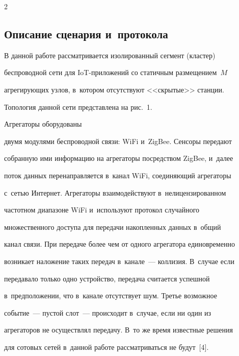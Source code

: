 \begin{multicols}{2}
\subsection{Описание сценария и~протокола}





\vspace*{-1pt}


    


    В данной работе рассматривается изолированный сегмент (кластер) 


беспроводной сети для IoT-при\-ло\-же\-ний со статичным размещением~$M$ 


агрегирующих узлов, в~котором отсутствуют <<скрытые>> станции. 


Топология данной сети представлена на рис.~1. 





Агрегаторы оборудованы 


двумя модулями беспроводной связи: WiFi и~ZigBee. Сенсоры передают 


собранную ими информацию на агрегаторы посредством ZigBee, и~далее 


поток данных перенаправляется в~канал WiFi, соединяющий агрегаторы 


с~сетью Интернет. Агрегаторы взаимодействуют в~нелицензированном 


частотном диапазоне WiFi и~используют протокол случайного 


множественного доступа для передачи накопленных данных в~общий 


канал связи. При передаче более чем от одного агрегатора единовременно 


возникает наложение таких передач в~канале~--- коллизия. В~случае если 


передавало только одно устройство, передача считается успешной 


в~предположении, что в~канале отсутствует шум. Третье возможное 


событие~--- пус\-той слот~--- происходит в~случае, если ни один из 


агрегаторов не осуществлял передачу. В~то же время известные решения 


для сотовых сетей в~данной работе рассматриваться не будут~[4].


    






\end{multicols}
